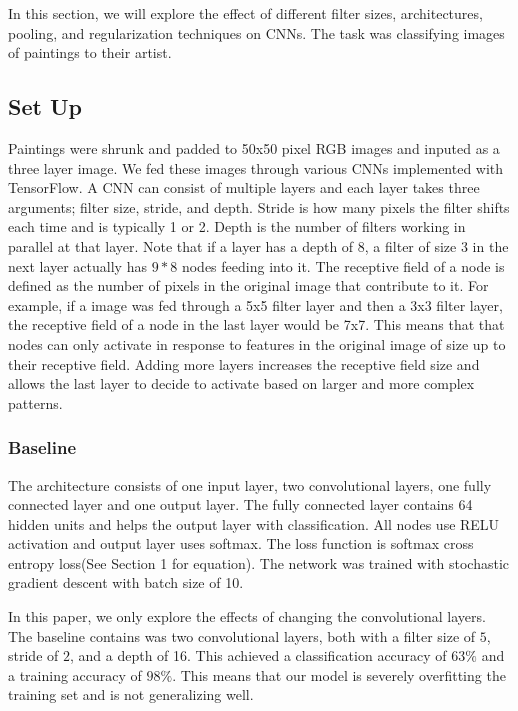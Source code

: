 \documentclass[10pt,twoside]{article}
\begin{document}
In this section, we will explore the effect of different filter sizes, architectures, pooling, and regularization techniques on CNNs. The task was classifying images of paintings to their artist.

\subsection{Set Up}

\noindent Paintings were shrunk and padded to 50x50 pixel RGB images and inputed as a three layer image. We fed these images through various CNNs implemented with TensorFlow. A CNN can consist of multiple layers and each layer takes three arguments; filter size, stride, and depth. Stride is how many pixels the filter shifts each time and is typically 1 or 2. Depth is the number of filters working in parallel at that layer. Note that if a layer has a depth of 8, a filter of size 3 in the next layer actually has $9*8$ nodes feeding into it. The receptive field of a node is defined as the number of pixels in the original image that contribute to it. For example, if a image was fed through a 5x5 filter layer and then a 3x3 filter layer, the receptive field of a node in the last layer would be 7x7. This means that that nodes can only activate in response to features in the original image of size up to their receptive field. Adding more layers increases the receptive field size and allows the last layer to decide to activate based on larger and more complex patterns.

\subsubsection{Baseline}
 The architecture consists of one input layer, two convolutional layers, one fully connected layer and one output layer. The fully connected layer contains 64 hidden units and helps the output layer with classification. All nodes use RELU activation and output layer uses softmax. The loss function is softmax cross entropy loss(See Section 1 for equation). The network was trained with stochastic gradient descent with batch size of 10.

 In this paper, we only explore the effects of changing the convolutional layers. The baseline contains was two convolutional layers, both with a filter size of $5$, stride of $2$, and a depth of 16. This achieved a classification accuracy of $63\%$ and a training accuracy of $98\%$. This means that our model is severely overfitting the training set and is not generalizing well.
\end{document}
